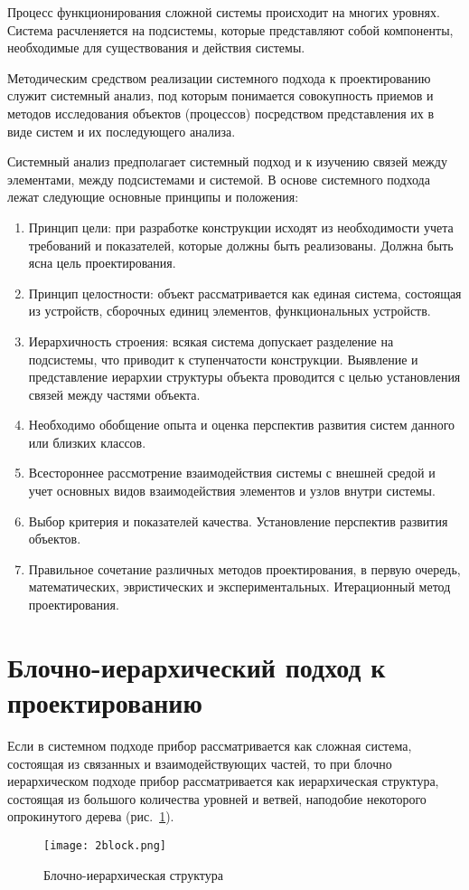 Процесс функционирования сложной системы происходит на многих уровнях. Система расчленяется на подсистемы, которые представляют собой компоненты, необходимые для существования и действия системы.

Методическим средством реализации системного подхода к проектированию служит системный анализ, под которым понимается совокупность приемов и методов исследования объектов (процессов) посредством представления их в виде систем и их последующего анализа.

Системный анализ предполагает системный подход и к изучению связей между элементами, между подсистемами и системой.
\newpage
В основе системного подхода лежат следующие основные принципы и положения:
\begin{enumerate}
	\item Принцип цели: при разработке конструкции исходят из необходимости учета требований и показателей, которые должны быть реализованы. Должна быть ясна цель проектирования.
	\item Принцип целостности: объект рассматривается как единая система, состоящая из устройств, сборочных единиц элементов, функциональных устройств.
	\item Иерархичность строения: всякая система допускает разделение на подсистемы, что приводит к ступенчатости конструкции. Выявление и представление иерархии структуры объекта проводится с целью установления связей между частями объекта.
	\item Необходимо обобщение опыта и оценка перспектив развития систем данного или близких классов.
	\item Всестороннее рассмотрение взаимодействия системы с внешней средой и учет основных видов взаимодействия элементов и узлов внутри системы.
	\item Выбор критерия и показателей качества. Установление перспектив развития объектов.
	\item Правильное сочетание различных методов проектирования, в первую очередь, математических, эвристических и экспериментальных. Итерационный метод проектирования.
\end{enumerate}

\section{Блочно-иерархический подход к проектированию}
Если в системном подходе прибор рассматривается как сложная система, состоящая из связанных и взаимодействующих частей, то при блочно иерархическом подходе прибор рассматривается как иерархическая структура, состоящая из большого количества уровней и ветвей, наподобие некоторого опрокинутого дерева (рис.~\ref{pic:2block}).
\begin{figure}[H]
	\caption{Блочно-иерархическая структура}
	\texttt{[image: 2block.png]}
	\label{pic:2block}
\end{figure}

